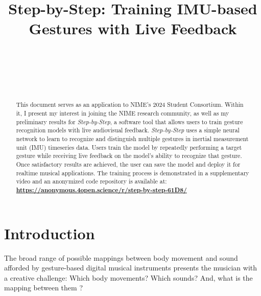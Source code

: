 \documentclass{nime-alternate} %
\begin{document}
\title{Step-by-Step: Training IMU-based Gestures with Live Feedback}


\label{key}


\author{
\alignauthor
{}\\
       \\
       \\
       \\
}

\maketitle
\begin{abstract}
This document serves as an application to NIME's 2024 Student Consortium. Within it, I present my interest in joining the NIME research community, as well as my preliminary results for \textit{Step-by-Step}, a software tool that allows users to train gesture recognition models with live audiovisual feedback. \textit{Step-by-Step} uses a simple neural network to learn to recognize and distinguish multiple gestures in inertial measurement unit (IMU) timeseries data. Users train the model by repeatedly performing a target gesture while receiving live feedback on the model’s ability to recognize that gesture. Once satisfactory results are achieved, the user can save the model and deploy it for realtime musical applications. The training process is demonstrated in a supplementary video and an anonymized code repository is available at: \href{https://anonymous.4open.science/r/step-by-step-61D8/}{\textbf{https://anonymous.4open.science/r/step-by-step-61D8/}}



\end{abstract} 

\printccsdesc

\section{Introduction}
The broad range of possible mappings between body movement and sound afforded by gesture-based digital musical instruments presents the musician with a creative challenge: Which body movements? Which sounds? And, what is the mapping between them \cite{mitchell:mapping}?
\end{document}
